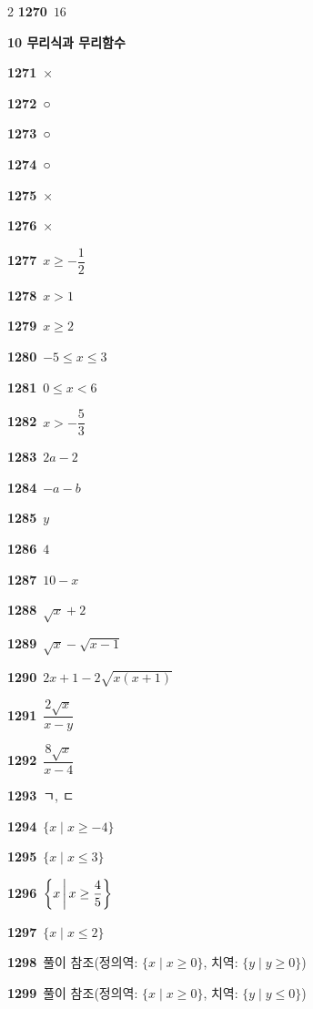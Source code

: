 \documentclass[10pt,a4paper]{article}
\begin{document}
\begin{multicols}{2}
\noindent\textbf{1270}\ $16$\par
\noindent\textbf{10 무리식과 무리함수}\par\smallskip
\noindent\textbf{1271}\ ×\par
\noindent\textbf{1272}\ ○\par
\noindent\textbf{1273}\ ○\par
\noindent\textbf{1274}\ ○\par
\noindent\textbf{1275}\ ×\par
\noindent\textbf{1276}\ ×\par
\noindent\textbf{1277}\ $x\ge -\dfrac{1}{2}$\par
\noindent\textbf{1278}\ $x>1$\par
\noindent\textbf{1279}\ $x\ge 2$\par
\noindent\textbf{1280}\ $-5\le x\le 3$\par
\noindent\textbf{1281}\ $0\le x<6$\par
\noindent\textbf{1282}\ $x>-\dfrac{5}{3}$\par
\noindent\textbf{1283}\ $2a-2$\par
\noindent\textbf{1284}\ $-a-b$\par
\noindent\textbf{1285}\ $y$\par
\noindent\textbf{1286}\ $4$\par
\noindent\textbf{1287}\ $10-x$\par
\noindent\textbf{1288}\ $\sqrt{x}+2$\par
\noindent\textbf{1289}\ $\sqrt{x}-\sqrt{x-1}$\par
\noindent\textbf{1290}\ $2x+1-2\sqrt{x(x+1)}$\par
\noindent\textbf{1291}\ $\dfrac{2\sqrt{x}}{x-y}$\par
\noindent\textbf{1292}\ $\dfrac{8\sqrt{x}}{x-4}$\par
\noindent\textbf{1293}\ ㄱ, ㄷ\par
\noindent\textbf{1294}\ $\{x \mid x\ge -4\}$\par
\noindent\textbf{1295}\ $\{x \mid x\le 3\}$\par
\noindent\textbf{1296}\ $\left\{x \mkern3mu \middle|\mkern3mu  x\ge \dfrac{4}{5}\right\}$\par
\noindent\textbf{1297}\ $\{x \mid x\le 2\}$\par
\noindent\textbf{1298}\ 풀이 참조(정의역: $\{x \mid x\ge 0\}$, 치역: $\{y \mid y\ge 0\}$)\par
\noindent\textbf{1299}\ 풀이 참조(정의역: $\{x \mid x\ge 0\}$, 치역: $\{y \mid y\le 0\}$)\par

\end{multicols}
\end{document}
